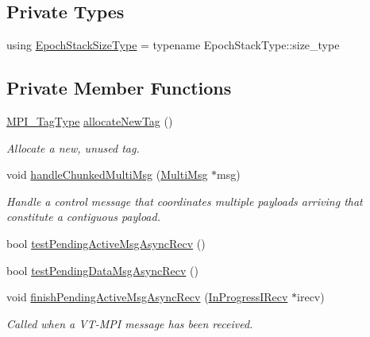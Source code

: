 \subsection*{Private Types}
\begin{DoxyCompactItemize}
\item 
using \hyperlink{structvt_1_1messaging_1_1_active_messenger_a447c6c0b3387142fd14b26c12e3ed877}{Epoch\+Stack\+Size\+Type} = typename Epoch\+Stack\+Type\+::size\+\_\+type
\end{DoxyCompactItemize}
\subsection*{Private Member Functions}
\begin{DoxyCompactItemize}
\item 
\hyperlink{namespacevt_1_1messaging_af700cb74b7b97c1a305267a9eb3ba91a}{M\+P\+I\+\_\+\+Tag\+Type} \hyperlink{structvt_1_1messaging_1_1_active_messenger_af2339f3300276bdc7e55706ce0cfff2a}{allocate\+New\+Tag} ()
\begin{DoxyCompactList}\small\item\em Allocate a new, unused tag. \end{DoxyCompactList}\item 
void \hyperlink{structvt_1_1messaging_1_1_active_messenger_a3ec09d3c055bee21bfd3d55a9c500b39}{handle\+Chunked\+Multi\+Msg} (\hyperlink{structvt_1_1messaging_1_1_multi_msg}{Multi\+Msg} $\ast$msg)
\begin{DoxyCompactList}\small\item\em Handle a control message that coordinates multiple payloads arriving that constitute a contiguous payload. \end{DoxyCompactList}\item 
bool \hyperlink{structvt_1_1messaging_1_1_active_messenger_a12133fda914a7809ac7ce7694efc312e}{test\+Pending\+Active\+Msg\+Async\+Recv} ()
\item 
bool \hyperlink{structvt_1_1messaging_1_1_active_messenger_ae8e94c46cd2948864a97a671428b64bc}{test\+Pending\+Data\+Msg\+Async\+Recv} ()
\item 
void \hyperlink{structvt_1_1messaging_1_1_active_messenger_a162667e5566546402f12baf8cf60d4da}{finish\+Pending\+Active\+Msg\+Async\+Recv} (\hyperlink{structvt_1_1messaging_1_1_in_progress_i_recv}{In\+Progress\+I\+Recv} $\ast$irecv)
\begin{DoxyCompactList}\small\item\em Called when a V\+T-\/\+M\+PI message has been received. \end{DoxyCompactList}\item 

\end{DoxyCompactItemize}
